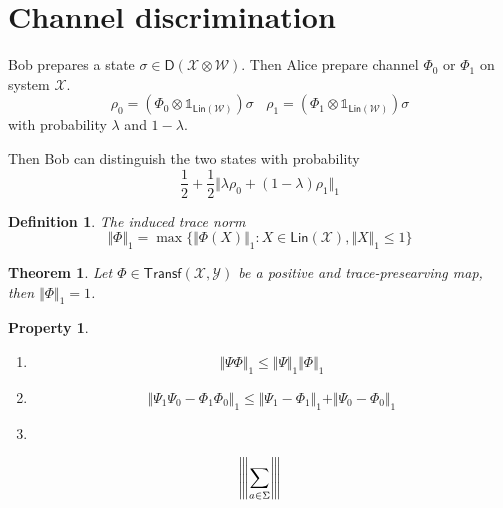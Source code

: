 \documentclass[aps,pra,onecolumn,notitlepage,superscriptaddress]{revtex4-1}
\newcommand{\spc}[1]{\mathcal{#1}}
\newcommand{\Lin}{\mathsf{Lin}}
\newcommand{\D}{\mathsf{D}}
\newcommand{\Transf}{{\mathsf{Transf}}}
\newcommand\I{\mathds{1}}
\newcommand{\vertiii}[1]{{\left\vert\kern-0.25ex\left\vert\kern-0.25ex\left\vert #1 
    \right\vert\kern-0.25ex\right\vert\kern-0.25ex\right\vert}}
\newtheorem{theo}{Theorem}
\newtheorem{defi}{Definition}
\newtheorem{proper}{Property}
\begin{document}
    \section{Channel discrimination}
    Bob prepares a state $\sigma \in \D(\spc X \otimes \spc W)$. Then Alice prepare channel $\Phi_0$ or $\Phi_1$ on system $\spc X$.
    \begin{equation}
        \rho_0 = (\Phi_0 \otimes \I_{\Lin(\spc W)}) \sigma \ \ \ \
        \rho_1 = (\Phi_1 \otimes \I_{\Lin(\spc W)}) \sigma 
    \end{equation}
    with probability $\lambda$ and $1-\lambda$. 

    Then Bob can distinguish the two states with probability
    \begin{equation}
        \frac 1 2 + \frac 1 2 \Vert \lambda \rho_0 + (1-\lambda) \rho_1  \Vert_1
    \end{equation}

    \begin{defi}
        The induced trace norm
        \begin{equation}
            \Vert \Phi \Vert_1 = \max \{ \Vert \Phi(X) \Vert_1 : X \in \Lin(\spc X), \Vert X \Vert_1\leq 1 \}
        \end{equation}
    \end{defi}

    \begin{theo}
        Let $\Phi \in \Transf(\spc X, \spc Y)$ be a positive and trace-presearving map, then $\Vert \Phi \Vert_1 = 1$.
    \end{theo}

    \begin{proper}
        \begin{enumerate}
            \item \begin{equation}
                \Vert \Psi\Phi \Vert_1 \leq \Vert \Psi \Vert_1 \Vert \Phi \Vert_1
            \end{equation}
            \item \begin{equation}
                \Vert \Psi_1\Psi_0 - \Phi_1\Phi_0 \Vert_1 \leq \Vert \Psi_1 - \Phi_1 \Vert_1 + \Vert \Psi_0 - \Phi_0 \Vert_1
            \end{equation}
            \item 
        \end{enumerate}
    \end{proper}
    
    \begin{equation}
        \vertiii {\sum_{a\in \Sigma}}
    \end{equation}
\end{document}

